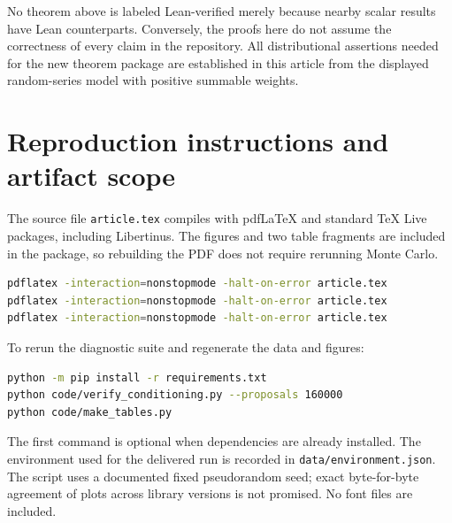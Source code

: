 \documentclass[11pt,a4paper]{article}
\numberwithin{equation}{section}
\theoremstyle{definition}
\theoremstyle{remark}
\begin{document}
No theorem above is labeled Lean-verified merely because nearby
scalar results have Lean counterparts. Conversely, the proofs here
do not assume the correctness of every claim in the repository.
All distributional assertions needed for the new theorem package
are established in this article from the displayed random-series
model with positive summable weights.

\section{Reproduction instructions and artifact scope}
The source file \texttt{article.tex} compiles with pdfLaTeX and
standard TeX Live packages, including Libertinus. The figures and
two table fragments are included in the package, so rebuilding the
PDF does not require rerunning Monte Carlo.
\begin{lstlisting}[language=bash]
pdflatex -interaction=nonstopmode -halt-on-error article.tex
pdflatex -interaction=nonstopmode -halt-on-error article.tex
pdflatex -interaction=nonstopmode -halt-on-error article.tex
\end{lstlisting}
To rerun the diagnostic suite and regenerate the data and figures:
\begin{lstlisting}[language=bash]
python -m pip install -r requirements.txt
python code/verify_conditioning.py --proposals 160000
python code/make_tables.py
\end{lstlisting}
The first command is optional when dependencies are already
installed. The environment used for the delivered run is recorded
in \texttt{data/environment.json}. The script uses a documented
fixed pseudorandom seed; exact byte-for-byte agreement of plots
across library versions is not promised. No font files are included.
\end{document}
